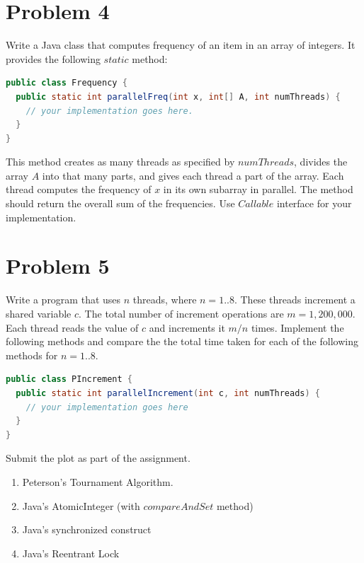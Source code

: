 \documentclass{article}
\begin{document}
\pagebreak
\section{Problem 4}
Write a Java class that computes frequency of an item in an array of integers. It provides the following $static$ method:

\begin{lstlisting}[language=Java]
public class Frequency {
  public static int parallelFreq(int x, int[] A, int numThreads) {
    // your implementation goes here.
  }
}
\end{lstlisting}

This method creates as many threads as specified by $numThreads$, divides the array $A$ into that many parts, and gives each thread a part of the array. Each thread computes the frequency of $x$ in its own subarray in parallel. The method should return the overall sum of the frequencies. Use $Callable$ interface for your implementation.

\pagebreak
\section{Problem 5}
Write a program that uses $n$ threads, where $n = 1..8$. These threads increment a shared variable $c$. The total number of increment operations are $m = 1, 200, 000$. Each thread reads the value of $c$ and increments it $m/n$ times. Implement the following methods and compare the the total time taken for each of
the following methods for $n = 1..8$.

\begin{lstlisting}[language=Java]
public class PIncrement {
  public static int parallelIncrement(int c, int numThreads) {
    // your implementation goes here
  }
}
\end{lstlisting}


Submit the plot as part of the assignment.

\begin{enumerate}[label=\alph*)]
  \item Peterson’s Tournament Algorithm.
  \item Java’s AtomicInteger (with $compareAndSet$ method)
  \item Java’s synchronized construct
  \item Java’s Reentrant Lock
\end{enumerate}
\end{document}
